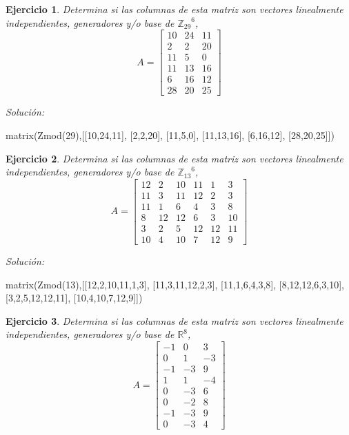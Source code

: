 \documentclass{amsart}
\newtheorem{ejer}{Ejercicio}
\begin{document}


\begin{ejer} Determina si las columnas de esta matriz son vectores linealmente independientes, generadores y/o base de ${{\mathbb Z}_{29}}^{6}$,
\[ A = \left[\begin{array}{rrr}
10 & 24 & 11 \\
2 & 2 & 20 \\
11 & 5 & 0 \\
11 & 13 & 16 \\
6 & 16 & 12 \\
28 & 20 & 25
\end{array}\right] \]
\end{ejer}

{\it Soluci\'on:}

\begin{sageblock}
matrix(Zmod(29),[[10,24,11],
[2,2,20],
[11,5,0],
[11,13,16],
[6,16,12],
[28,20,25]])
\end{sageblock}



\begin{ejer} Determina si las columnas de esta matriz son vectores linealmente independientes, generadores y/o base de ${{\mathbb Z}_{13}}^{6}$,
\[ A = \left[\begin{array}{rrrrrr}
12 & 2 & 10 & 11 & 1 & 3 \\
11 & 3 & 11 & 12 & 2 & 3 \\
11 & 1 & 6 & 4 & 3 & 8 \\
8 & 12 & 12 & 6 & 3 & 10 \\
3 & 2 & 5 & 12 & 12 & 11 \\
10 & 4 & 10 & 7 & 12 & 9
\end{array}\right] \]
\end{ejer}

{\it Soluci\'on:}

\begin{sageblock}
matrix(Zmod(13),[[12,2,10,11,1,3],
[11,3,11,12,2,3],
[11,1,6,4,3,8],
[8,12,12,6,3,10],
[3,2,5,12,12,11],
[10,4,10,7,12,9]])
\end{sageblock}



\begin{ejer} Determina si las columnas de esta matriz son vectores linealmente independientes, generadores y/o base de ${{\mathbb R}}^{8}$,
\[ A = \left[\begin{array}{rrr}
-1 & 0 & 3 \\
0 & 1 & -3 \\
-1 & -3 & 9 \\
1 & 1 & -4 \\
0 & -3 & 6 \\
0 & -2 & 8 \\
-1 & -3 & 9 \\
0 & -3 & 4
\end{array}\right] \]
\end{ejer}
\end{document}
